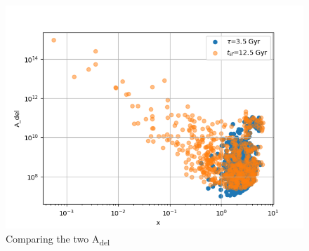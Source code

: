 \documentclass[a4paper,twocolumn]{article}
\begin{document}
\begin{figure}[htbp]
\centering
\includegraphics[width=.9\linewidth]{./figs/Comparing_the_A_x.png}
\caption{\label{fig:Comparing the two A_{del}}Comparing the two A\textsubscript{del}}
\end{figure}
\end{document}

